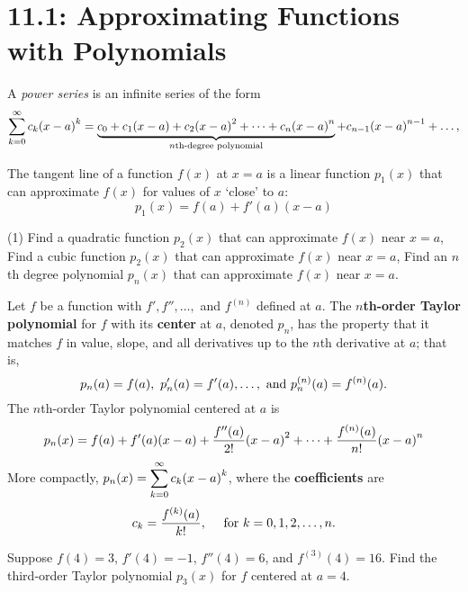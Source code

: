 \documentclass[../mathNotesPreamble]{subfiles}
\begin{document}
  \section{11.1: Approximating Functions with Polynomials}

  A \textit{power series} is an infinite series of the form
    \[\sum_{k=0}^\infty c_k{\left(x-a\right)}^k=\underbrace{c_0+c_1{\left(x-a\right)}+c_2{\left(x-a\right)}^2+\dots+c_n{\left(x-a\right)}^n}_{n\textnormal{th-degree polynomial}}+c_{n-1}{\left(x-a\right)}^{n-1}+\dots,\]
  \begin{ex*}
    The tangent line of a function $f(x)$ at $x=a$ is a linear function $p_1(x)$ that can approximate $f(x)$ for values of $x$ `close' to $a$:
      \[p_1(x)=f(a)+f'(a)(x-a)\]
    \begin{tasks}[after-item-skip=\stretch{1}, label=,item-indent=0pt](1)
      \task Find a quadratic function $p_2(x)$ that can approximate $f(x)$ near $x=a$,
      \task Find a cubic function $p_2(x)$ that can approximate $f(x)$ near $x=a$,
      \task Find an $n$th degree polynomial $p_n(x)$ that can approximate $f(x)$ near $x=a$.
    \end{tasks}

  \end{ex*}
  \pagebreak

  \begin{defn*}
    Let $f$ be a function with $f', f'', \dots,$ and $f^{(n)}$ defined at $a$. The \textbf{$n$th-order Taylor polynomial} for $f$ with its \textbf{center} at $a$, denoted $p_n$, has the property that it matches $f$ in value, slope, and all derivatives up to the $n$th derivative at $a$; that is,
      \[p_n(a)=f(a),\ p_n'(a)=f'(a),\dots,\textnormal{ and } p_n^{(n)}(a)=f^{(n)}(a).\]
    The $n$th-order Taylor polynomial centered at $a$ is
      \[p_n(x)=f(a)+f'(a){\left(x-a\right)}+\frac{f''(a)}{2!}{\left(x-a\right)}^2+\dots+\frac{f^{(n)}(a)}{n!}{\left(x-a\right)}^n\]
    More compactly, $\displaystyle p_n(x)=\sum_{k=0}^\infty c_k{\left(x-a\right)}^k$, where the \textbf{coefficients} are
      \[c_k=\frac{f^{(k)}(a)}{k!},\quad\textnormal{ for }k=0,1,2,\dots,n.\]
  \end{defn*}
  \begin{ex*}
    Suppose $f(4)=3$, $f'(4)=-1$, $f''(4)=6$, and $f^{(3)}(4)=16$. Find the third-order Taylor polynomial $p_3(x)$ for $f$ centered at $a=4$.
  \end{ex*}
  \pagebreak
\end{document}
